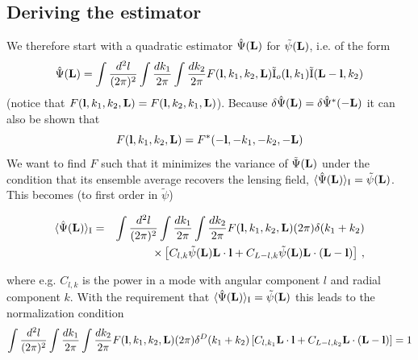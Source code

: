 \documentclass[12pt]{article}
\newcommand{\beq}{\begin{equation}}
\newcommand{\eeq}{\end{equation}}
\newcommand{\beqal}{\begin{aligned}}
\newcommand{\eeqal}{\end{aligned}}
\def\l{{\bf l}}
\def\L{{\bf L}}
\def\iul{{\rm I}}
\def\il{{\tilde{\rm I}}}
\def\d2l{\frac{d^2l}{(2\pi)^2}}
\def\dko{\frac{dk_1}{2\pi}}
\def\dkt{\frac{dk_2}{2\pi}}
\numberwithin{equation}{section}
\begin{document}
%
%
%


\subsection{Deriving the estimator}
We therefore start with a quadratic estimator $\hat{\Psi}(\L)$ for $\tilde{\psi}(\L)$,
i.e. of the form
\beq
\hat{\Psi} (\L) = \int \d2l \int \dko \int \dkt F(\l,k_1,k_2,\L)
\il_o(\l,k_1) \il(\L-\l,k_2)
\label{eq:quadest}
\eeq
(notice that $F(\l,k_1,k_2,\L)=F(\l,k_2,k_1,\L)$). Because $\delta
\hat{\Psi}(\L)=\delta \hat{\Psi}^*(-\L)$ it can also be shown that
\beq
F(\l,k_1,k_2,\L) = F^*(-\l,-k_1,-k_2,-\L)
\eeq
We want to find $F$ such that it minimizes the variance of $\tilde{\Psi}(\L)$
under the condition that its ensemble average recovers the lensing field,
$\langle \hat{\Psi}(\L)\rangle_\iul = \tilde{\psi}(\L)$. This becomes (to first order in $\tilde{\psi}$)

\beq
\beqal
\langle \hat{\Psi}(\L)\rangle_\iul &=&  \int \d2l \int \dko \int \dkt  F(\l,k_1,k_2,\L)  (2\pi)\delta(k_1+k_2) \\
& & \times \left[C_{l,k} \tilde{\psi}(\L)\L\cdot\l + C_{L-l,k}  \tilde{\psi}(\L)\L\cdot(\L-\l)\right] \, ,
\eeqal
\eeq

where e.g. $C_{l,k}$ is the power in a mode with angular component $l$ and radial component $k$.
With the requirement that $\langle \hat{\Psi}(\L)\rangle_\iul=\tilde{\psi}(\L)$ this
leads to the normalization condition
\beq
\int \d2l \int \dko \int \dkt F(\l,k_1,k_2,\L) (2\pi) \delta^D(k_1+k_2)
\left[C_{l,k_1}\L\cdot\l + C_{L-l,k_2} \L\cdot (\L-\l)\right] = 1
\label{eq:normcond}
\eeq
\end{document}
